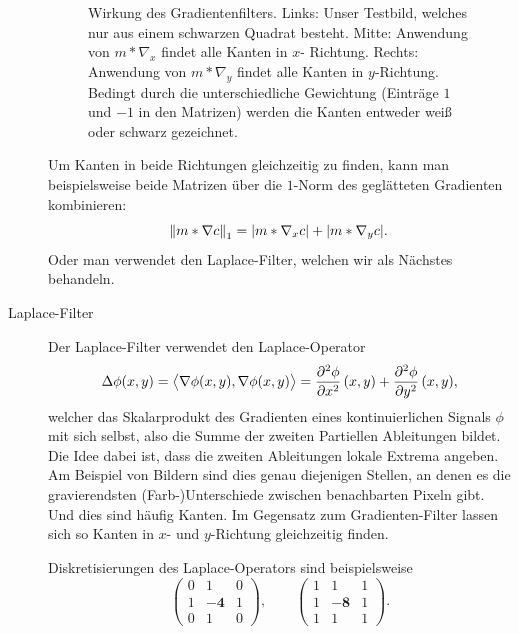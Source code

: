 \begin{example}
\begin{description}
\begin{figure}[ht]
\begin{minipage}{0.3\textwidth}
    \end{minipage}
  \caption{Wirkung des Gradientenfilters. Links: Unser Testbild, welches nur aus einem schwarzen 
    Quadrat besteht. Mitte: Anwendung von $ m * \nabla_{x} $ findet alle Kanten in $ x $-
    Richtung. Rechts: Anwendung von $ m * \nabla_{y} $ findet alle Kanten in $ y $-Richtung.
    Bedingt durch die unterschiedliche Gewichtung (Einträge $ 1 $ und $ -1 $ in den Matrizen)
    werden die Kanten entweder weiß oder schwarz gezeichnet.}
  \label{fig:Gradient}
  \end{figure}
  Um Kanten in beide Richtungen gleichzeitig zu finden, kann man beispielsweise beide Matrizen über 
  die $ 1 $-Norm des geglätteten Gradienten kombinieren:
  \[
    \norm{m * \nabla c}_{1} = |m * \nabla_{x} c| + |m * \nabla_{y} c|.
  \]
  Oder man verwendet den Laplace-Filter, welchen wir als Nächstes behandeln.
\item [Laplace-Filter] Der Laplace-Filter verwendet den Laplace-Operator
  \[
      \Delta \phi(x,y) 
    = \left\langle \nabla \phi(x,y), \nabla \phi(x,y) \right\rangle
    = \dpd[2]{\phi}{x}(x,y) + \dpd[2]{\phi}{y}(x,y),
  \]
  welcher das Skalarprodukt des Gradienten eines kontinuierlichen Signals $ \phi $ mit sich selbst, 
  also die Summe der zweiten Partiellen Ableitungen bildet. Die Idee dabei ist, dass die zweiten
  Ableitungen lokale Extrema angeben. Am Beispiel von Bildern sind dies genau diejenigen Stellen,
  an denen es die gravierendsten (Farb-)Unterschiede zwischen benachbarten Pixeln gibt. Und dies
  sind häufig Kanten. Im Gegensatz zum Gradienten-Filter lassen sich so Kanten in $ x $- und $ y 
  $-Richtung gleichzeitig finden.
  
  Diskretisierungen des Laplace-Operators sind beispielsweise
  \[
    \begin{pmatrix}
      0 & 1 & 0 \\
      1 & \mathbf{-4} & 1 \\
      0 & 1 & 0
    \end{pmatrix}, \qquad
    \begin{pmatrix}
      1 & 1 & 1 \\
      1 & \mathbf{-8} & 1 \\
      1 & 1 & 1
    \end{pmatrix}.
  \]
  

\end{description}
\end{example}
